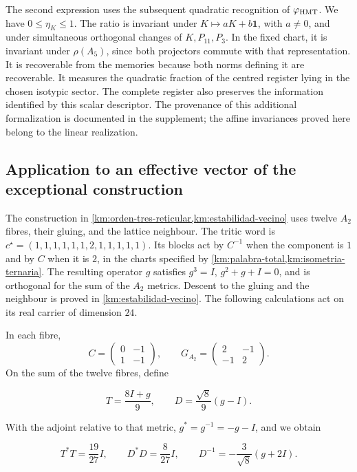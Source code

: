 The second expression uses the subsequent quadratic recognition of \(\varphi_{\rm HMT}\). We have \(0\le\eta_K\le1\). The ratio is invariant under \(K\mapsto aK+b\mathbf1\), with \(a\ne0\), and under simultaneous orthogonal changes of \(K,P_{11},P_3\). In the fixed chart, it is invariant under \(\rho(A_5)\), since both projectors commute with that representation. It is recoverable from the memories because both norms defining it are recoverable. It measures the quadratic fraction of the centred register lying in the chosen isotypic sector. The complete register also preserves the information identified by this scalar descriptor. The provenance of this additional formalization is documented in the supplement; the affine invariances proved here belong to the linear realization.

\subsection{Application to an effective vector of the exceptional construction}

The construction in \cref{km:orden-tres-reticular,km:estabilidad-vecino} uses twelve \(A_2\) fibres, their gluing, and the lattice neighbour. The tritic word is \(c^\star=(1,1,1,1,1,1,2,1,1,1,1,1)\). Its blocks act by \(C^{-1}\) when the component is \(1\) and by \(C\) when it is \(2\), in the charts specified by \cref{km:palabra-total,km:isometria-ternaria}. The resulting operator \(g\) satisfies \(g^3=I\), \(g^2+g+I=0\), and is orthogonal for the sum of the \(A_2\) metrics. Descent to the gluing and the neighbour is proved in \cref{km:estabilidad-vecino}. The following calculations act on its real carrier of dimension \(24\).

In each fibre,
\[
 C=\begin{pmatrix}0&-1\\1&-1\end{pmatrix},
 \qquad
 G_{A_2}=\begin{pmatrix}2&-1\\-1&2\end{pmatrix}.
\]
On the sum of the twelve fibres, define

\[
T=\frac{8I+g}{9},\qquad D=\frac{\sqrt8}{9}(g-I).
\]

With the adjoint relative to that metric, \(g^*=g^{-1}=-g-I\), and we obtain

\begin{equation}
T^*T=\frac{19}{27}I,
\qquad D^*D=\frac8{27}I,
\qquad D^{-1}=-\frac3{\sqrt8}(g+2I).
\label{nuc11:eq:18}
\end{equation}

